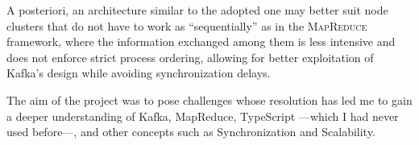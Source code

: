 A posteriori, an architecture similar to the adopted one may better suit node clusters that do not have to work as ``sequentially'' as in the \textsc{MapReduce} framework, where the information exchanged among them is less intensive and does not enforce strict process ordering, allowing for better exploitation of Kafka's design while avoiding synchronization delays.

The aim of the project was to pose challenges whose resolution has led me to gain a deeper understanding of Kafka, MapReduce, TypeScript ---which I had never used before---, and other concepts such as Synchronization and Scalability.